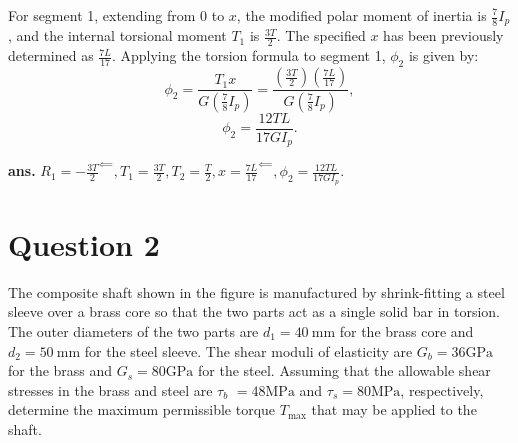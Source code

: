 \documentclass[12pt]{article}
\begin{document}
For segment 1, extending from 0 to \(x\), the modified polar moment of inertia is \(\frac{7}{8}I_p\), and the internal torsional moment \(T_1\) is \(\frac{3T}{2}\). The specified \(x\) has been previously determined as \(\frac{7L}{17}\). Applying the torsion formula to segment 1, \(\phi_2\) is given by:
\[
\phi_2 = \frac{T_1 x}{G\left(\frac{7}{8}I_p\right)} = \frac{\left(\frac{3T}{2}\right) \left(\frac{7L}{17}\right)}{G\left(\frac{7}{8}I_p\right)},
\]
\[
\phi_2 = \frac{12TL}{17GI_p}.
\]
\AnswerTag



\vfill
\begin{flushright}
\textbf{ans.} \(R_1=-\frac{3T}{2}^{\impliedby}, T_1= \frac{3T}{2}, T_2 = \frac{T}{2}, x = \frac{7L}{17}^{\impliedby}, \phi_2 = \frac{12TL}{17GI_p}.\)
\end{flushright}

\newpage
\section*{Question 2}
\begin{q}
The composite shaft shown in the figure is manufactured by shrink-fitting a steel sleeve over a brass core so that the two parts act as a single solid bar in torsion. The outer diameters of the two parts are \(d_1=40 \mathrm{~mm}\) for the brass core and \(d_2=50 \mathrm{~mm}\) for the steel sleeve. The shear moduli of elasticity are \(G_b=36 \mathrm{GPa}\) for the brass and \(G_s=80 \mathrm{GPa}\) for the steel. Assuming that the allowable shear stresses in the brass and steel are \(\tau_b\) \(=48 \mathrm{MPa}\) and \(\tau_s=80 \mathrm{MPa}\), respectively, determine the maximum permissible torque \(T_{\max }\) that may be applied to the shaft.
\end{q}

\begin{figure}[!ht]
    \centering
    \caption{}
    \label{fig:enter-label}
\end{figure}
\end{document}
